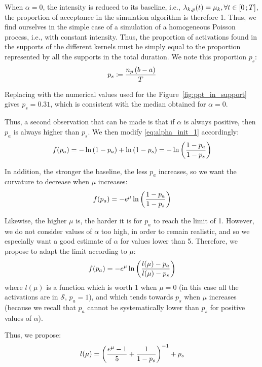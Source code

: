 When $\alpha = 0$, the intensity is reduced to its baseline, i.e., $\lambda_{k,p}(t) = \mu_k, \forall t \in \left[ 0 \, ; T \right]$, the proportion of acceptance in the simulation algorithm is therefore 1.
Thus, we find ourselves in the simple case of a simulation of a homogeneous Poisson process, i.e., with constant intensity.
Thus, the proportion of activations found in the supports of the different kernels must be simply equal to the proportion represented by all the supports in the total duration.
We note this proportion $p_s$:
\begin{equation}
    p_s \coloneqq \frac{n_p \left( b-a \right)}{T}
\end{equation}

Replacing with the numerical values used for the Figure~\ref{fig:ppt_in_support} gives $p_s = 0.31$, which is consistent with the median obtained for $\alpha = 0$.

Thus, a second observation that can be made is that if $\alpha$ is always positive, then $p_a$ is always higher than $p_s$.
We then modify \ref{eq:alpha_init_1} accordingly:
\begin{equation}
    f(p_a) = -\ln\left( 1-p_a \right) + \ln\left( 1-p_s \right) = -\ln\left( \frac{1 - p_a}{1 - p_s} \right)
\end{equation}

In addition, the stronger the baseline, the less $p_a$ increases, so we want the curvature to decrease when $\mu$ increases:
\begin{equation}
    f(p_a) = - e^{\mu} \ln\left( \frac{1 - p_a}{1 - p_s} \right)
\end{equation}

Likewise, the higher $\mu$ is, the harder it is for $p_a$ to reach the limit of 1.
However, we do not consider values of $\alpha$ too high, in order to remain realistic, and so we especially want a good estimate of $\alpha$ for values lower than 5.
Therefore, we propose to adapt the limit according to $\mu$:
\begin{equation}
    f(p_a) = - e^{\mu} \ln\left( \frac{l(\mu) - p_a}{l(\mu)  - p_s} \right)
\end{equation}
where $l(\mu)$ is a function which is worth 1 when $\mu = 0$ (in this case all the activations are in $\mathcal{S}$, $p_a = 1$), and which tends towards $p_s$ when $\mu$ increases (because we recall that $p_a$ cannot be systematically lower than $p_s$ for positive values of $\alpha$).

Thus, we propose:
\begin{equation}
    l(\mu) = \left( \frac{e^{\mu}-1}{5} + \frac{1}{1-p_s} \right)^{-1} + p_s
\end{equation}

